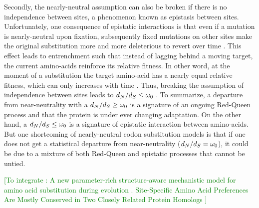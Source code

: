 Secondly, the \gls{nearly-neutral} assumption can also be broken if there is no independence between sites, a phenomenon known as epistasis between sites.
Unfortunately, one consequence of epistatic interactions is that even if a mutation is \gls{nearly-neutral} upon fixation, subsequently fixed mutations on other sites make the original \gls{substitution} more and more deleterious to revert over time \citep{Gong2014, Lunzer2010, Mccandlish2013}.
This effect leads to entrenchment such that instead of lagging behind a moving target, the current amino-acids reinforce its relative fitness.
In other word, at the moment of a \gls{substitution} the target amino-acid has a nearly equal relative fitness, which can only increases with time \citep{Goldstein2016, Goldstein2017}.
Thus, breaking the assumption of independence between sites leads to $d_N / d_S \leq \omega_0$ \citep{Rodrigue2016}.
To summarize, a departure from near-neutrality with a $d_N / d_S \geq \omega_0$ is a signature of an ongoing Red-Queen process and that the protein is under ever changing adaptation.
On the other hand, a $d_N / d_S \leq \omega_0$ is a signature of epistatic interaction between amino-acids.
But one shortcoming of \gls{nearly-neutral} \gls{codon} \gls{substitution} models is that if one does not get a statistical departure from near-neutrality ($d_N / d_S = \omega_0$), it could be due to a mixture of both Red-Queen and epistatic processes that cannot be untied.

\textcolor{GREEN}{[To integrate :
A new parameter-rich structure-aware mechanistic model for amino acid {substitution} during evolution \citep{Chi2018}.
Site-Specific Amino Acid Preferences Are Mostly Conserved in Two Closely Related Protein Homologs \citep{Doud2015}]}

